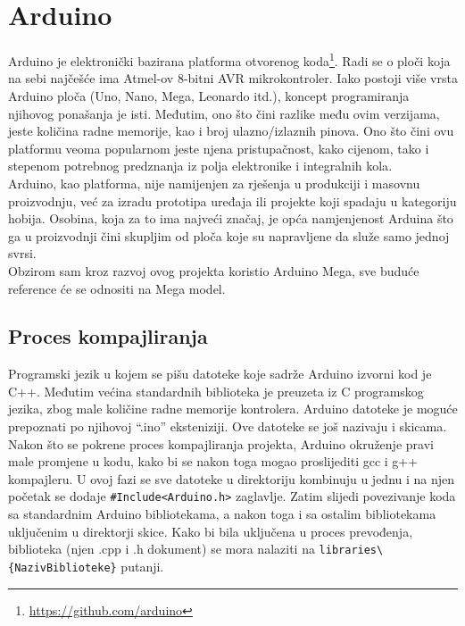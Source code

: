 \documentclass[../Document.tex]{subfiles}
\begin{document}
\section{Arduino}
Arduino je elektronički bazirana platforma otvorenog koda\footnote{\url{https://github.com/arduino}}. Radi se o ploči koja na sebi najčešće ima Atmel-ov 8-bitni AVR mikrokontroler. Iako postoji više vrsta Arduino ploča (Uno, Nano, Mega, Leonardo itd.), koncept programiranja njihovog ponašanja je isti. Međutim, ono što čini razlike među ovim verzijama, jeste količina radne memorije, kao i broj ulazno/izlaznih pinova. Ono što čini ovu platformu veoma popularnom jeste njena pristupačnost, kako cijenom, tako i stepenom potrebnog predznanja iz polja elektronike i integralnih kola\cite{arduino}.\\

Arduino, kao platforma, nije namijenjen za rješenja u produkciji i masovnu proizvodnju, već za izradu prototipa uređaja ili projekte koji spadaju u kategoriju hobija. Osobina, koja za to ima najveći značaj, je opća namjenjenost Arduina što ga u proizvodnji čini skupljim od ploča koje su napravljene da služe samo jednoj svrsi.\\

\noindent Obzirom sam kroz razvoj ovog projekta koristio Arduino Mega, sve buduće reference će se odnositi na Mega model.

\subsection{Proces kompajliranja}\label{kompajliranje}
Programski jezik u kojem se pišu datoteke koje sadrže Arduino izvorni kod je C++. Međutim većina standardnih biblioteka je preuzeta iz C programskog jezika, zbog male količine radne memorije kontrolera. Arduino datoteke je moguće prepoznati po njihovoj ``.ino'' eksteniziji. Ove datoteke se još nazivaju i skicama.\\

Nakon što se pokrene proces kompajliranja projekta, Arduino okruženje pravi male promjene u kodu, kako bi se nakon toga mogao proslijediti gcc i g++ kompajleru. U ovoj fazi se sve datoteke u direktoriju kombinuju u jednu i na njen početak se dodaje \verb|#Include<Arduino.h>| zaglavlje. Zatim slijedi povezivanje koda sa standardnim Arduino bibliotekama, a nakon toga i sa ostalim bibliotekama uključenim u direktorji skice. Kako bi bila uključena u proces prevođenja, biblioteka (njen .cpp i .h dokument) se mora nalaziti na \verb|libraries\{NazivBiblioteke}| putanji\cite{arduinoWiki}.\\
\end{document}
